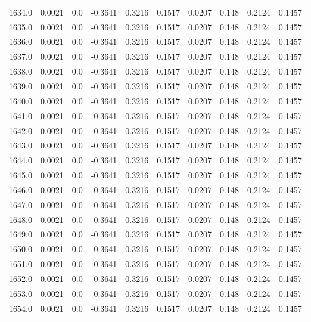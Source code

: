 \begin{longtable}{lrrrrrrrrr}
1634.0 & 0.0021 & 0.0 & -0.3641 & 0.3216 & 0.1517 & 0.0207 & 0.148 & 0.2124 & 0.1457 \\
1635.0 & 0.0021 & 0.0 & -0.3641 & 0.3216 & 0.1517 & 0.0207 & 0.148 & 0.2124 & 0.1457 \\
1636.0 & 0.0021 & 0.0 & -0.3641 & 0.3216 & 0.1517 & 0.0207 & 0.148 & 0.2124 & 0.1457 \\
1637.0 & 0.0021 & 0.0 & -0.3641 & 0.3216 & 0.1517 & 0.0207 & 0.148 & 0.2124 & 0.1457 \\
1638.0 & 0.0021 & 0.0 & -0.3641 & 0.3216 & 0.1517 & 0.0207 & 0.148 & 0.2124 & 0.1457 \\
1639.0 & 0.0021 & 0.0 & -0.3641 & 0.3216 & 0.1517 & 0.0207 & 0.148 & 0.2124 & 0.1457 \\
1640.0 & 0.0021 & 0.0 & -0.3641 & 0.3216 & 0.1517 & 0.0207 & 0.148 & 0.2124 & 0.1457 \\
1641.0 & 0.0021 & 0.0 & -0.3641 & 0.3216 & 0.1517 & 0.0207 & 0.148 & 0.2124 & 0.1457 \\
1642.0 & 0.0021 & 0.0 & -0.3641 & 0.3216 & 0.1517 & 0.0207 & 0.148 & 0.2124 & 0.1457 \\
1643.0 & 0.0021 & 0.0 & -0.3641 & 0.3216 & 0.1517 & 0.0207 & 0.148 & 0.2124 & 0.1457 \\
1644.0 & 0.0021 & 0.0 & -0.3641 & 0.3216 & 0.1517 & 0.0207 & 0.148 & 0.2124 & 0.1457 \\
1645.0 & 0.0021 & 0.0 & -0.3641 & 0.3216 & 0.1517 & 0.0207 & 0.148 & 0.2124 & 0.1457 \\
1646.0 & 0.0021 & 0.0 & -0.3641 & 0.3216 & 0.1517 & 0.0207 & 0.148 & 0.2124 & 0.1457 \\
1647.0 & 0.0021 & 0.0 & -0.3641 & 0.3216 & 0.1517 & 0.0207 & 0.148 & 0.2124 & 0.1457 \\
1648.0 & 0.0021 & 0.0 & -0.3641 & 0.3216 & 0.1517 & 0.0207 & 0.148 & 0.2124 & 0.1457 \\
1649.0 & 0.0021 & 0.0 & -0.3641 & 0.3216 & 0.1517 & 0.0207 & 0.148 & 0.2124 & 0.1457 \\
1650.0 & 0.0021 & 0.0 & -0.3641 & 0.3216 & 0.1517 & 0.0207 & 0.148 & 0.2124 & 0.1457 \\
1651.0 & 0.0021 & 0.0 & -0.3641 & 0.3216 & 0.1517 & 0.0207 & 0.148 & 0.2124 & 0.1457 \\
1652.0 & 0.0021 & 0.0 & -0.3641 & 0.3216 & 0.1517 & 0.0207 & 0.148 & 0.2124 & 0.1457 \\
1653.0 & 0.0021 & 0.0 & -0.3641 & 0.3216 & 0.1517 & 0.0207 & 0.148 & 0.2124 & 0.1457 \\
1654.0 & 0.0021 & 0.0 & -0.3641 & 0.3216 & 0.1517 & 0.0207 & 0.148 & 0.2124 & 0.1457 \\

\end{longtable}
